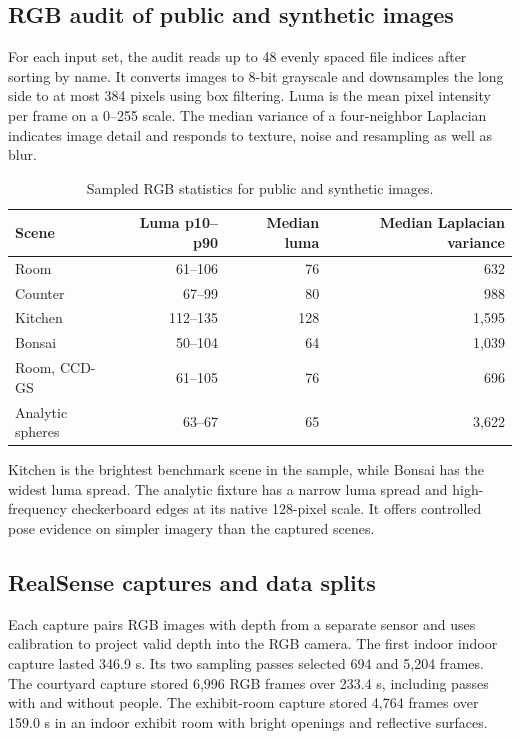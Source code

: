 \documentclass[11pt,a4paper]{article}
\begin{document}
\subsection{RGB audit of public and synthetic images}
For each input set, the audit reads up to 48 evenly spaced file indices
after sorting by name. It converts images to 8-bit grayscale and downsamples
the long side to at most 384 pixels using box filtering. Luma is the mean
pixel intensity per frame on a 0--255 scale. The median variance of a
four-neighbor Laplacian indicates image detail and responds to texture,
noise and resampling as well as blur.

\begin{table}[!ht]
\centering\small
\begin{tabularx}{\linewidth}{@{}Yrrr@{}}
\toprule
\textbf{Scene} & \textbf{Luma p10--p90} & \textbf{Median luma} & \textbf{Median Laplacian variance} \\
\midrule
Room & 61--106 & 76 & 632 \\
Counter & 67--99 & 80 & 988 \\
Kitchen & 112--135 & 128 & 1,595 \\
Bonsai & 50--104 & 64 & 1,039 \\
Room, CCD-GS & 61--105 & 76 & 696 \\
Analytic spheres & 63--67 & 65 & 3,622 \\
\bottomrule
\end{tabularx}
\caption{Sampled RGB statistics for public and synthetic images.}
\label{tab:benchmark-rgb}
\end{table}

Kitchen is the brightest benchmark scene in the sample, while Bonsai has
the widest luma spread. The analytic fixture has a narrow luma spread and
high-frequency checkerboard edges at its native 128-pixel scale. It offers
controlled pose evidence on simpler imagery than the captured scenes.

\clearpage
\subsection{RealSense captures and data splits}
Each capture pairs RGB images with depth from a separate sensor and uses
calibration to project valid depth into the RGB camera. The first indoor
indoor capture lasted 346.9 s. Its two sampling passes selected 694 and
5,204 frames. The courtyard capture stored 6,996 RGB frames over
233.4 s, including passes with and without people. The exhibit-room
capture stored 4,764 frames over 159.0 s in an indoor exhibit room with
bright openings and reflective surfaces.
\end{document}
